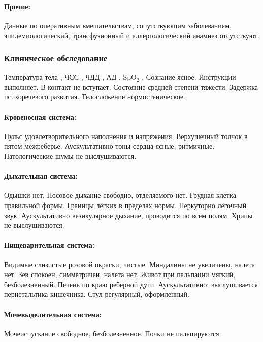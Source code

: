 \documentclass[a4paper,14pt]{extarticle}
\newcommand{\oCelsius}{\tcdegree{}C}
\newcommand{\bpm}{уд/мин}
\newcommand{\mpm}{/мин}
\newcommand{\torr}{торр}
\begin{document}
\paragraph{Прочие:} Данные по оперативным вмешательствам, сопутствующим заболеваниям, эпидемиологический, трансфузионный и аллергологический анамнез отсутствуют.

\subsubsection*{Клиническое обследование}

Температура тела \numprint[\oCelsius]{36.6}, ЧСС \numprint[\bpm]{122}, ЧДД \numprint[\mpm]{29}, АД \numprint[\torr]{80/55}, SpO$_2$ .
Сознание ясное.
Инструкции выполняет.
В контакт не вступает.
Состояние средней степени тяжести.
Задержка психоречевого развития.
Телосложение нормостеническое.

\paragraph{Кровеносная система:} Пульс удовлетворительного наполнения и напряжения. Верхушечный толчок в пятом межреберье. Аускультативно тоны сердца ясные, ритмичные. Патологические шумы не выслушиваются.

\paragraph{Дыхательная система:} Одышки нет. Носовое дыхание свободно, отделяемого нет. Грудная клетка правильной формы. Границы лёгких в пределах нормы. Перкуторно лёгочный звук. Аускультативно везикулярное дыхание, проводится по всем полям. Хрипы не выслушиваются.

\paragraph{Пищеварительная система:} Видимые слизистые розовой окраски, чистые. Миндалины не увеличены, налета нет. Зев спокоен, симметричен, налета нет. Живот при пальпации мягкий, безболезненный. Печень по краю реберной дуги. Аускультативно: выслушивается перистальтика кишечника. Стул регулярный, оформленный.

\paragraph{Мочевыделительная система:} Мочеиспускание свободное, безболезненное. Почки не пальпируются.
\end{document}
